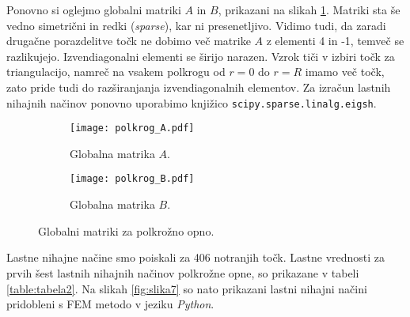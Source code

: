 \documentclass[12pt,a4paper]{article}
\begin{document}
\noindent Ponovno si oglejmo globalni matriki $A$ in $B$, prikazani na slikah \ref{fig:slika6}. Matriki sta še vedno simetrični in redki (\textit{sparse}), kar ni presenetljivo. Vidimo tudi, da zaradi drugačne porazdelitve točk ne dobimo več matrike $A$ z elementi 4 in -1, temveč se razlikujejo. Izvendiagonalni elementi se širijo narazen. Vzrok tiči v izbiri točk za triangulacijo, namreč na vsakem polkrogu od $r=0$ do $r=R$ imamo več točk, zato pride tudi do razširanjanja izvendiagonalnih elementov. Za izračun lastnih nihajnih načinov ponovno uporabimo knjižico \texttt{scipy.sparse.linalg.eigsh}.

\begin{figure}[H]
    \centering
    \begin{subfigure}[b]{0.45\textwidth}  			
        \texttt{[image: polkrog\_A.pdf]}
        \caption{Globalna matrika $A$.}
    \end{subfigure}
    \begin{subfigure}[b]{0.45\textwidth}  			
        \texttt{[image: polkrog\_B.pdf]}
        \caption{Globalna matrika $B$.}
    \end{subfigure}
    \caption{Globalni matriki za polkrožno opno.} \label{fig:slika6}
\end{figure}

\noindent Lastne nihajne načine smo poiskali za 406 notranjih točk. Lastne vrednosti za prvih šest lastnih nihajnih načinov polkrožne opne, so prikazane v tabeli \ref{table:tabela2}. Na slikah \ref{fig:slika7} so nato prikazani lastni nihajni načini pridobleni s FEM metodo v jeziku \textit{Python}.
\end{document}
